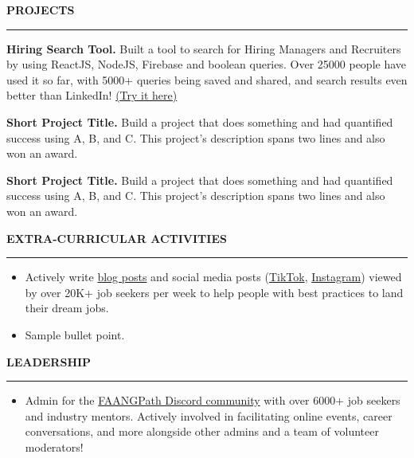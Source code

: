 \documentclass[11pt,letterpaper]{article}
\begin{document}

\medskip
\MakeUppercase{{\bf Projects}} %
\medskip
\hrule %
\begin{list}{}{\setlength{\leftmargin}{0em}}
\item %
\vspace{-1.25em}
\item \textbf{Hiring Search Tool.} {Built a tool to search for Hiring Managers and Recruiters by using ReactJS, NodeJS, Firebase and boolean queries. Over 25000 people have used it so far, with 5000+ queries being saved and shared, and search results even better than LinkedIn! \href{https://hiring-search.careerflow.ai/}{(Try it here)}}
\item \textbf{Short Project Title.} {Build a project that does something and had quantified success using A, B, and C. This project's description spans two lines and also won an award.}
\item \textbf{Short Project Title.} {Build a project that does something and had quantified success using A, B, and C. This project's description spans two lines and also won an award.}
\end{list}


\medskip
\MakeUppercase{{\bf Extra-Curricular Activities}} %
\medskip
\hrule %
\begin{list}{}{\setlength{\leftmargin}{0em}}
\item
\begin{itemize}
    \item 	Actively write \href{https://www.faangpath.com/blog/}{blog posts} and social media posts (\href{https://www.tiktok.com/@faangpath}{TikTok}, \href{https://www.instagram.com/faangpath/?hl=en}{Instagram}) viewed by over 20K+ job seekers per week to help people with best practices to land their dream jobs. 
    \item	Sample bullet point.
\end{itemize}
\end{list}



\medskip
\MakeUppercase{{\bf Leadership}} %
\medskip
\hrule %
\begin{list}{}{\setlength{\leftmargin}{0em}}
\item
\begin{itemize}
    \item Admin for the \href{https://discord.com/invite/WWbjEaZ}{FAANGPath Discord community} with over 6000+ job seekers and industry mentors. Actively involved in facilitating online events, career conversations, and more alongside other admins and a team of volunteer moderators! 
\end{itemize}
\end{list}
\end{document}
